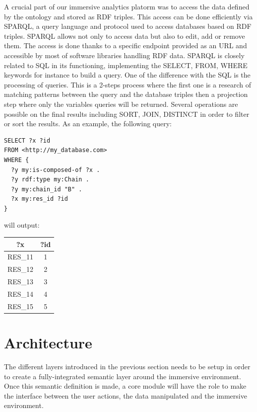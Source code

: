 \documentclass{vgtc}                          %
\begin{document}
A crucial part of our immersive analytics platorm was to access the data defined by the ontology and stored as RDF triples. This access can be done efficiently via SPARQL, a query language and protocol used to access databases based on RDF triples. SPARQL allows not only to access data but also to edit, add or remove them. The access is done thanks to a specific endpoint provided as an URL and accessible by most of software libraries handling RDF data. SPARQL is closely related to SQL in its functioning, implementing the SELECT, FROM, WHERE keywords for instance to build a query. One of the difference with the SQL is the processing of queries. This is a 2-steps process where the first one is a research of matching patterns between the query and the database triples then a projection step where only the variables queries will be returned. Several operations are possible on the final results including SORT, JOIN, DISTINCT in order to filter or sort the results.
As an example, the following query:

\begin{lstlisting}[language=SPARQL]
SELECT ?x ?id
FROM <http://my_database.com> 
WHERE {
  ?y my:is-composed-of ?x .
  ?y rdf:type my:Chain .
  ?y my:chain_id "B" .
  ?x my:res_id ?id
}
\end{lstlisting}
\noindent
will output:

\begin{center}
 \begin{tabular}{|c | c|} 
 \hline
 ?x & ?id \\ [0.5ex] 
 \hline
 RES\_11 & 1 \\ 
 RES\_12 & 2 \\
 RES\_13 & 3 \\
 RES\_14 & 4 \\
 RES\_15 & 5 \\
 \hline
\end{tabular}
\end{center}
\noindent

\section{Architecture}

The different layers introduced in the previous section needs to be setup in order to create a fully-integrated semantic layer around the immersive environment. Once this semantic definition is made, a core module will have the role to make the interface between the user actions, the data manipulated and the immersive environment.
\end{document}
